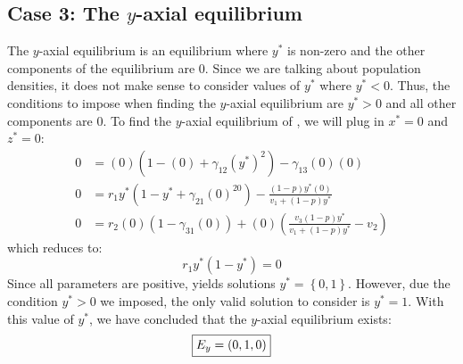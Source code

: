 \subsection{Case 3: The $y$-axial equilibrium}\label{subsec:y_axial_equilibrium}
The $y$-axial equilibrium is an equilibrium where $y^*$ is non-zero and the other components of the equilibrium are 0. Since we are talking about population densities, it does not make sense to consider values of $y^*$ where $y^*<0$. Thus, the conditions to impose when finding the $y$-axial equilibrium are $y^*>0$ and all other components are 0. To find the $y$-axial equilibrium of , we will plug in $x^*=0$ and $z^*=0$:
\begin{align*}
    0 &= (0)\left(1-(0)+\gamma_{12}\left(y^*\right)^2\right)-\gamma_{13}(0)(0)\\
    0 &= r_1y^*\left(1-y^*+\gamma_{21}(0)^20\right)-\frac{\left(1-p\right)y^*(0)}{v_1+\left(1-p\right)y^*}\\
    0 &= r_2(0)\left(1-\gamma_{31}(0)\right)+(0)\left(\frac{v_3\left(1-p\right)y^*}{v_1+\left(1-p\right)y^*}-v_2\right)
\end{align*}
which reduces to:
\begin{equation}
    r_1y^*\left(1-y^*\right)=0
    \label{eq:4.3}
\end{equation}
Since all parameters are positive,  yields solutions $y^*=\left\{0, 1\right\}$. However, due the condition $y^*>0$ we imposed, the only valid solution to consider is $y^*=1$. With this value of $y^*$, we have concluded that the $y$-axial equilibrium exists:
\[
\fbox{$\displaystyle E_y=\left(
0,
1,
0
\right)$}
\]

